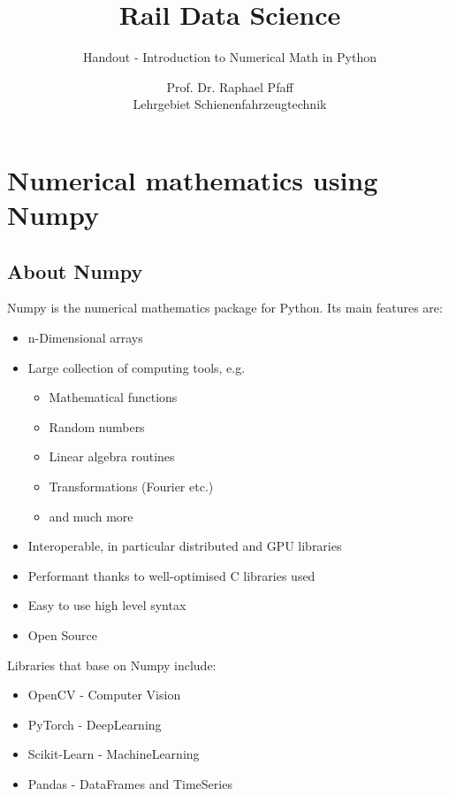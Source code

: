 \documentclass[11pt,a4paper, d]{scrartcl}
\author{Prof. Dr. Raphael Pfaff\\Lehrgebiet Schienenfahrzeugtechnik}
\title{Rail Data Science}
\subtitle{Handout - Introduction to Numerical Math in Python}
\providecommand{\tightlist}{%
      \setlength{\itemsep}{0pt}\setlength{\parskip}{0pt}}
\begin{document}
    
    \maketitle
    
    

    
    \hypertarget{numerical-mathematics-using-numpy}{%
\section{Numerical mathematics using
Numpy}\label{numerical-mathematics-using-numpy}}

\hypertarget{about-numpy}{%
\subsection{About Numpy}\label{about-numpy}}

Numpy is the numerical mathematics package for Python. Its main features
are:

\begin{itemize}
\tightlist
\item
  n-Dimensional arrays
\item
  Large collection of computing tools, e.g.

  \begin{itemize}
  \tightlist
  \item
    Mathematical functions
  \item
    Random numbers
  \item
    Linear algebra routines
  \item
    Transformations (Fourier etc.)
  \item
    and much more
  \end{itemize}
\item
  Interoperable, in particular distributed and GPU libraries
\item
  Performant thanks to well-optimised C libraries used
\item
  Easy to use high level syntax
\item
  Open Source
\end{itemize}

Libraries that base on Numpy include:

\begin{itemize}
\tightlist
\item
  OpenCV - Computer Vision
\item
  PyTorch - DeepLearning
\item
  Scikit-Learn - MachineLearning
\item
  Pandas - DataFrames and TimeSeries
\end{itemize}
\end{document}
